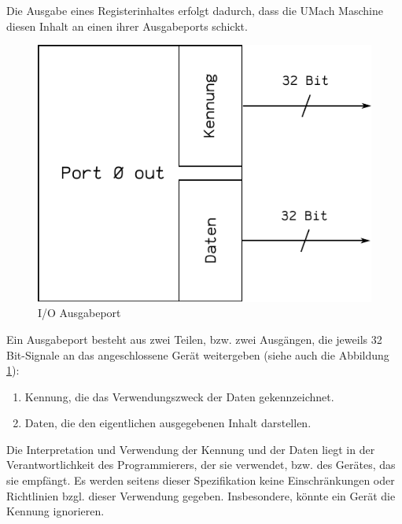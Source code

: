 Die Ausgabe eines Registerinhaltes erfolgt dadurch, dass die UMach Maschine
diesen Inhalt an einen ihrer Ausgabeports schickt.

\begin{figure}[htp]
 \centering
 \includegraphics{./img/UMach-IOPort.pdf}
 \caption{I/O Ausgabeport}
 \label{fig:IOPort}
\end{figure}

Ein Ausgabeport besteht aus zwei Teilen, bzw. zwei Ausgängen, die jeweils 32
Bit-Signale an das angeschlossene Gerät weitergeben (siehe auch die Abbildung
\ref{fig:IOPort}):

\begin{enumerate}
 \item Kennung, die das Verwendungszweck der Daten gekennzeichnet.
 \item Daten, die den eigentlichen ausgegebenen Inhalt darstellen.
\end{enumerate}

Die Interpretation und Verwendung der Kennung und der Daten liegt in der
Verantwortlichkeit des Programmierers, der sie verwendet, bzw. des Gerätes, das
sie empfängt. Es werden seitens dieser Spezifikation keine Einschränkungen oder
Richtlinien bzgl. dieser Verwendung gegeben. Insbesondere, könnte ein Gerät die
Kennung ignorieren.
